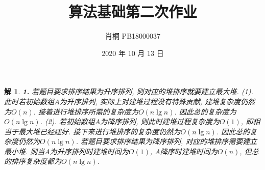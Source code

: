 \documentclass[UTF8]{ctexart}
\begin{document}
	\title{算法基础第二次作业}
	\author{肖桐 PB18000037}
	\date{2020 年 10 月 13 日}
	\maketitle

	\newtheorem*{solution}{解}

	\begin{solution}\textnormal{\textbf{1.}}
		若题目要求排序结果为升序排列, 则对应的堆排序就要建立最大堆.\newline
		(1). 此时若初始数组$A$为升序排列, 实际上对建堆过程没有特殊贡献, 建堆复杂度仍然为$O(n)$. 接着进行堆排序所需的复杂度为$O(n\lg n)$.\newline
		因此总的复杂度为$O(n\lg n)$.\newline
		(2). 若初始数组$A$为降序排列, 则此时建堆过程复杂度为$O(1)$, 即相当于最大堆已经建好. 接下来进行堆排序的复杂度仍然为$O(n\lg n)$.\newline
		因此总的复杂度仍然为$O(n\lg n)$.\newline
		若题目要求排序结果为降序排列, 对应的堆排序需要建立最小堆. 则当$A$为升序排列时建堆时间为$O(1)$, $A$降序时建堆时间为$O(n)$, 但总的排序复杂度都为$O(n\lg n)$.
	\end{solution}
\end{document}
